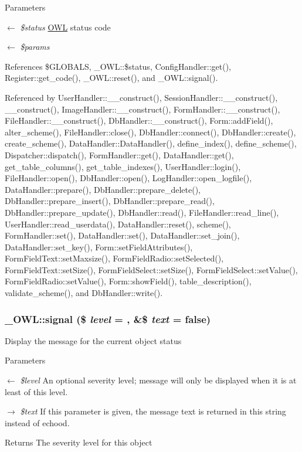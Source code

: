 \begin{DoxyParams}{Parameters}
\item[\mbox{$\leftarrow$} {\em \$status}]\hyperlink{classOWL}{OWL} status code \item[\mbox{$\leftarrow$} {\em \$params}]\end{DoxyParams}


References \$GLOBALS, \_\-OWL::\$status, ConfigHandler::get(), Register::get\_\-code(), \_\-OWL::reset(), and \_\-OWL::signal().



Referenced by UserHandler::\_\-\_\-construct(), SessionHandler::\_\-\_\-construct(), \_\-\_\-construct(), ImageHandler::\_\-\_\-construct(), FormHandler::\_\-\_\-construct(), FileHandler::\_\-\_\-construct(), DbHandler::\_\-\_\-construct(), Form::addField(), alter\_\-scheme(), FileHandler::close(), DbHandler::connect(), DbHandler::create(), create\_\-scheme(), DataHandler::DataHandler(), define\_\-index(), define\_\-scheme(), Dispatcher::dispatch(), FormHandler::get(), DataHandler::get(), get\_\-table\_\-columns(), get\_\-table\_\-indexes(), UserHandler::login(), FileHandler::open(), DbHandler::open(), LogHandler::open\_\-logfile(), DataHandler::prepare(), DbHandler::prepare\_\-delete(), DbHandler::prepare\_\-insert(), DbHandler::prepare\_\-read(), DbHandler::prepare\_\-update(), DbHandler::read(), FileHandler::read\_\-line(), UserHandler::read\_\-userdata(), DataHandler::reset(), scheme(), FormHandler::set(), DataHandler::set(), DataHandler::set\_\-join(), DataHandler::set\_\-key(), Form::setFieldAttributes(), FormFieldText::setMaxsize(), FormFieldRadio::setSelected(), FormFieldText::setSize(), FormFieldSelect::setSize(), FormFieldSelect::setValue(), FormFieldRadio::setValue(), Form::showField(), table\_\-description(), validate\_\-scheme(), and DbHandler::write().

\subsubsection[{signal}]{\setlength{\rightskip}{0pt plus 5cm}\_\-OWL::signal (\$ {\em level} = {}, \/  \&\$ {\em text} = {\ttfamily false})}\label{class__OWL_a51ba4a16409acf2a2f61f286939091a5}
Display the message for the current object status


\begin{DoxyParams}{Parameters}
\item[\mbox{$\leftarrow$} {\em \$level}]An optional severity level; message will only be displayed when it is at least of this level. \item[\mbox{$\rightarrow$} {\em \$text}]If this parameter is given, the message text is returned in this string instead of echood. \end{DoxyParams}
\begin{DoxyReturn}{Returns}
The severity level for this object 
\end{DoxyReturn}


